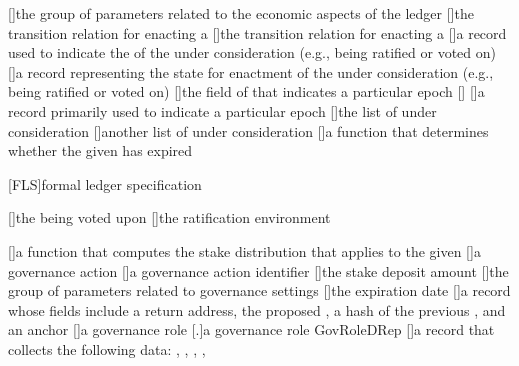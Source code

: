 [\protect{}]{the group of parameters related to the economic aspects of the ledger}
[\protect{}]{the transition relation for enacting a \GovAction}
[\protect{}]{the transition relation for enacting a \GovAction}
[\protect{}]{a record used to indicate the \GovActionID of the \GovAction under consideration (e.g., being ratified or voted on)}
[\protect{}]{a record representing the state for enactment of the \GovAction under consideration (e.g., being ratified or voted on)}
[\protect{}]{the field of \EpochStructure that indicates a particular epoch}
[\protect{}]{}
[\protect{}]{a record primarily used to indicate a particular epoch}
[\protect{}]{the list of \GovActions under consideration}
[\protect{}]{another list of \GovActions under consideration}
[\protect{}]{a function that determines whether the given \Epoch has expired}

[FLS]{formal ledger specification}

[\protect{}]{the \GovAction being voted upon}
[\protect\AgdaBound{\Gamma}]{the ratification environment}

[\protect{}]{a function that computes the stake distribution that applies to the given \GovRole}
[\protect{}]{a governance action}
[\protect{}]{a governance action identifier}
[\protect{}]{the \GovAction stake deposit amount}
[\protect{}]{the group of parameters related to governance settings}
[\protect{}]{the \GovAction expiration date}
[\protect{}]{a record whose fields include a return address, the proposed \GovAction, a hash of the previous \GovAction, and an anchor}
[\protect{}]{a governance role}
[\protect{}.\protect{}]{a governance role}
GovRoleDRep
[\protect{}]{a record that collects the following data: \GovActionID, \GovRole, \Credential, \Vote, \MaybeAnchor}

